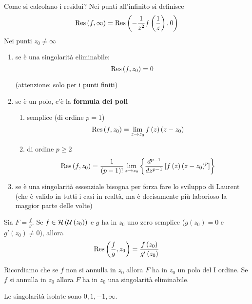 \begin{rem}
Come si calcolano i residui?
Nei punti all'infinito si definisce
\begin{equation*}
\operatorname{Res} \left(f,\infty \right) = \operatorname{Res} \left(- \frac{1}{z^{2}} f\left(\frac{1}{z}\right) ,0\right)
\end{equation*}
Nei punti $z_{0} \neq \infty $
\begin{enumerate}
\item se è una singolarità eliminabile:\begin{equation*}
\operatorname{Res} \left(f,z_{0}\right) = 0
\end{equation*}

(attenzione: solo per i punti finiti)
\item se è un polo, c'è la \textbf{formula dei poli}
\begin{enumerate}
\item semplice (di ordine $p = 1$)\begin{equation*}
\operatorname{Res} \left(f,z_{0}\right) = \lim\limits _{z\rightarrow z_{0}} f\left(z\right)\left(z - z_{0}\right)
\end{equation*}
\item di ordine $p\geqslant 2$\begin{equation*}
\operatorname{Res} \left(f,z_{0}\right) = \frac{1}{\left(p - 1\right) !}\lim\limits _{z\rightarrow z_{0}}\left\{\frac{d^{p - 1}}{dz^{p - 1}}\left[ f\left(z\right)\left(z - z_{0}\right)^{p}\right]\right\}
\end{equation*}
\end{enumerate}
\item se è una singolarità essenziale bisogna per forza fare lo sviluppo di Laurent (che è valido in tutti i casi in realtà, ma è decisamente più laborioso la maggior parte delle volte)
\end{enumerate}
\end{rem}
\begin{thm}
Sia $F = \frac{f}{g}$. Se $f\in \mathcal{H} \left(\mathcal{U} \left(z_{0}\right)\right)$ e $g$ ha in $z_{0}$ uno zero semplice ($g\left(z_{0}\right) = 0$ e $g'\left(z_{0}\right) \neq 0$), allora\begin{equation*}
\operatorname{Res} \left(\frac{f}{g} ,z_{0}\right) = \frac{f\left(z_{0}\right)}{g'\left(z_{0}\right)}
\end{equation*}

Ricordiamo che se $f$ non si annulla in $z_{0}$ allora $F$ ha in $z_{0}$ un polo del I ordine. Se $f$ si annulla in $z_{0}$ allora $F$ ha in $z_{0}$ una singolarità eliminabile.
\end{thm}
Le singolarità isolate sono $0,1, - 1,\infty $.


